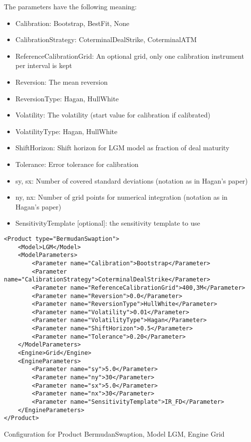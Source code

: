 The parameters have the following meaning:

\begin{itemize}
\item Calibration: Bootstrap, BestFit, None
\item CalibrationStrategy: CoterminalDealStrike, CoterminalATM
\item ReferenceCalibrationGrid: An optional grid, only one calibration instrument per interval is kept
\item Reversion: The mean reversion
\item ReversionType: Hagan, HullWhite
\item Volatility: The volatility (start value for calibration if calibrated)
\item VolatilityType: Hagan, HullWhite
\item ShiftHorizon: Shift horizon for LGM model as fraction of deal maturity
\item Tolerance: Error tolerance for calibration
\item sy, sx: Number of covered standard deviations (notation as in Hagan's paper)
\item ny, nx: Number of grid points for numerical integration (notation as in Hagan's paper)
\item SensitivityTemplate [optional]: the sensitivity template to use 
\end{itemize}

\begin{longlisting}
\begin{verbatim}
<Product type="BermudanSwaption">
    <Model>LGM</Model>
    <ModelParameters>
        <Parameter name="Calibration">Bootstrap</Parameter>
        <Parameter name="CalibrationStrategy">CoterminalDealStrike</Parameter>
        <Parameter name="ReferenceCalibrationGrid">400,3M</Parameter>
        <Parameter name="Reversion">0.0</Parameter>
        <Parameter name="ReversionType">HullWhite</Parameter>
        <Parameter name="Volatility">0.01</Parameter>
        <Parameter name="VolatilityType">Hagan</Parameter>
        <Parameter name="ShiftHorizon">0.5</Parameter>
        <Parameter name="Tolerance">0.20</Parameter>
    </ModelParameters>
    <Engine>Grid</Engine>
    <EngineParameters>
        <Parameter name="sy">5.0</Parameter>
        <Parameter name="ny">30</Parameter>
        <Parameter name="sx">5.0</Parameter>
        <Parameter name="nx">30</Parameter>
        <Parameter name="SensitivityTemplate">IR_FD</Parameter>
    </EngineParameters>
</Product>
\end{verbatim}
\caption{Configuration for Product BermudanSwaption, Model LGM, Engine Grid}
\label{lst:peconfig_BermudanSwaption_LGM_Grid}
\end{longlisting}

